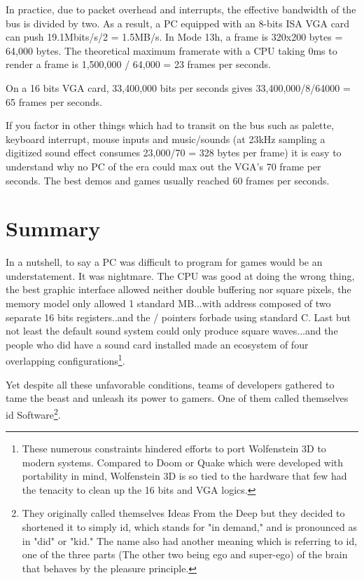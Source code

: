 \documentclass[book.tex]{subfiles}
\begin{document}
 In practice, due to packet overhead and interrupts, the effective bandwidth of the bus is divided by two. As a result, a PC equipped with an 8-bits ISA VGA card can push 19.1Mbits/s/2 = 1.5MB/s. In Mode 13h, a frame is 320x200 bytes = 64,000 bytes. The theoretical maximum framerate with a CPU taking 0ms to render a frame is 1,500,000 / 64,000 = 23 frames per seconds.\\
 \par
 On a 16 bits VGA card, 33,400,000 bits per seconds gives 33,400,000/8/64000 = 65 frames per seconds.\\
 \par
 If you factor in other things which had to transit on the bus such as palette, keyboard interrupt, mouse inputs and music/sounds (at 23kHz sampling a digitized sound effect consumes 23,000/70 = 328 bytes per frame) it is easy to understand why no PC of the era could max out the VGA's 70 frame per seconds. The best demos and games usually reached 60 frames per seconds.


\section{Summary}
In a nutshell, to say a PC was difficult to program for games would be an understatement. It was nightmare. The CPU was good at doing the wrong thing, the best graphic interface allowed neither double buffering nor square pixels, the memory model only allowed 1 standard MB...with address composed of two separate 16 bits registers..and the / pointers forbade using standard C. Last but not least the default sound system could only produce square waves...and the people who did have a sound card installed made an ecosystem of four overlapping configurations\footnote{These numerous constraints hindered efforts to port Wolfenstein 3D to modern systems. Compared to Doom or Quake which were developed with portability in mind, Wolfenstein 3D is so tied to the hardware that few had the tenacity to clean up the 16 bits and VGA logics.}.\\
\par
Yet despite all these unfavorable conditions, teams of developers gathered to tame the beast and unleash its power to gamers. One of them called themselves id Software\footnote{They originally called themselves Ideas From the Deep but they decided to shortened it to simply id, which stands for "in demand," and is pronounced as in "did" or "kid." The name also had another meaning which is referring to id, one of the three parts (The other two being ego and super-ego) of the brain that behaves by the pleasure principle.}.
\end{document}
